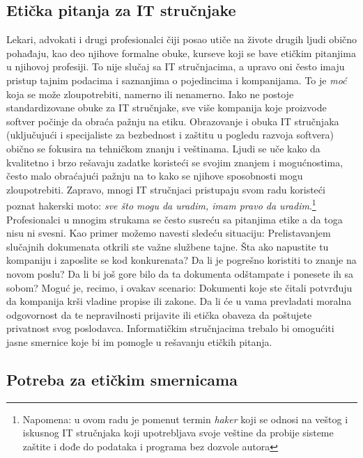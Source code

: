 \documentclass[a4paper]{article}
\begin{document}
{\subsection{Etička pitanja za IT stručnjake}

Lekari, advokati i drugi profesionalci čiji posao utiče na živote drugih ljudi obično pohađaju, kao deo njihove formalne obuke, kurseve koji se bave etičkim pitanjima u njihovoj profesiji. To nije slučaj sa IT stru\-čnja\-ci\-ma, a upravo oni često imaju pristup tajnim podacima i saznanjima o pojedincima i kompanijama. To je \emph{moć} koja se može zloupotrebiti, namerno ili nenamerno. Iako ne postoje standardizovane obuke za IT stručnjake, sve više kompanija koje proizvode softver počinje da obraća pažnju na etiku.
Obrazovanje i obuka IT stručnjaka (uključujući i specijaliste za bezbednost i zaštitu u pogledu razvoja softvera) obično se fokusira na tehničkom znanju i veštinama. Ljudi se uče kako da kvalitetno i brzo rešavaju zadatke koristeći se svojim znanjem i mogućnostima, često malo obraćajući pažnju na to kako se njihove sposobnosti mogu zloupotrebiti. Zapravo, mnogi IT stručnjaci pristupaju svom radu koristeći poznat hakerski moto: \textit{sve što mogu da uradim, imam pravo da uradim}.\footnote{Napomena: u ovom radu je pomenut termin \textit{haker} koji se odnosi na veštog i iskusnog IT stručnjaka koji upotrebljava svoje veštine da probije sisteme zaštite i dođe do podataka i programa bez dozvole autora} 
\\ Profesionalci u mnogim strukama se često susreću sa pitanjima etike a da toga nisu ni svesni. Kao primer možemo navesti sledeću situaciju: Prelistavanjem slučajnih dokumenata otkrili ste važne službene tajne. Šta ako napustite tu kompaniju i zaposlite se kod konkurenata? Da li je pogrešno koristiti to znanje na novom poslu? Da li bi još gore bilo da ta dokumenta odštampate i ponesete ih sa sobom?
Moguć je, recimo, i ovakav scenario: Dokumenti koje ste čitali potvrđuju da kompanija krši vladine propise ili zakone. Da li će u vama prevladati moralna odgovornost da te nepravilnosti prijavite ili etička obaveza da poštujete privatnost svog poslodavca.\cite{Schneider}\cite{Reynolds}
Informatičkim stručnjacima trebalo bi omogućiti jasne smernice koje bi im pomogle u rešavanju etičkih pitanja.

\subsection{Potreba za etičkim smernicama}

}
\end{document}
